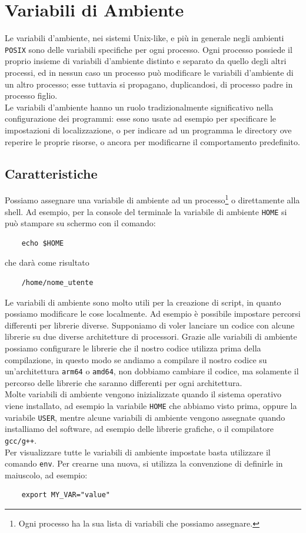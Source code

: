 \chapter{Variabili di Ambiente}
Le variabili d'ambiente, nei sistemi Unix-like, e più in generale negli ambienti \verb*|POSIX| sono delle variabili specifiche per ogni processo. Ogni processo possiede il proprio insieme di variabili d'ambiente distinto e separato da quello degli altri processi, ed in nessun caso un processo può modificare le variabili d'ambiente di un altro processo; esse tuttavia si propagano, duplicandosi, di processo padre in processo figlio. \\
Le variabili d'ambiente hanno un ruolo tradizionalmente significativo nella configurazione dei programmi: esse sono usate ad esempio per specificare le impostazioni di localizzazione, o per indicare ad un programma le directory ove reperire le proprie risorse, o ancora per modificarne il comportamento predefinito. \\
\section{Caratteristiche}
Possiamo assegnare una variabile di ambiente ad un processo\footnote{Ogni processo ha la sua lista di variabili che possiamo assegnare.} o direttamente alla shell. Ad esempio, per la console del terminale la variabile di ambiente \verb*|HOME| si può stampare su schermo con il comando:
\begin{verbatim}
	echo $HOME
\end{verbatim}
che darà come risultato
\begin{verbatim}
	/home/nome_utente
\end{verbatim}

Le variabili di ambiente sono molto utili per la creazione di script, in quanto possiamo modificare le cose localmente. Ad esempio è possibile impostare percorsi differenti per librerie diverse. Supponiamo di voler lanciare un codice con alcune librerie su due diverse architetture di processori. Grazie alle variabili di ambiente possiamo configurare le librerie che il nostro codice utilizza prima della compilazione, in questo modo se andiamo a compilare il nostro codice su un'architettura \verb*|arm64| o \verb*|amd64|, non dobbiamo cambiare il codice, ma solamente il percorso delle librerie che saranno differenti per ogni architettura.\\

Molte variabili di ambiente vengono inizializzate quando il sistema operativo viene installato, ad esempio la variabile \verb*|HOME| che abbiamo visto prima, oppure la variabile \verb*|USER|, mentre alcune variabili di ambiente vengono assegnate quando installiamo del software, ad esempio delle librerie grafiche, o il compilatore \verb*|gcc/g++|.\\
Per visualizzare tutte le variabili di ambiente impostate basta utilizzare il comando \verb*|env|. Per crearne una nuova, si utilizza la convenzione di definirle in maiuscolo, ad esempio:
\begin{verbatim}
	export MY_VAR="value"
\end{verbatim}

